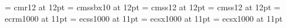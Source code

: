\def\setcodefonts#1#2{
  \font\CMfont = cmr12 at #1  %
  \font\KWfont = cmssbx10 at #1   %
  \font\VRfont = cmss12 at #1   %
  \font\BGfont = cmss12 at #1   %
  \font\rawcm  = ecrm1000 at #2  %
  \font\rawrm  = ecss1000 at #2  %
  \font\rawbf  = ecsx1000 at #2
  \font\rawhv  = ecsx1000 at #2
}
\setcodefonts{12pt}{11pt}

\def\labelitemi{\textbullet}
\def\la{{\rawrm\char'074}}
\def\ra{{\rawrm\char'076}}
\def\codeleq{{\ensuremath\leq}}
\def\codeminus{{\ensuremath-}}
\def\codelb{{\rawrm\char'173}}
\def\coderb{{\rawrm\char'175}}
\def\textlt{{\rawcm\char'074}}
\def\textgt{{\rawcm\char'076}}
\def\cd#1{{\BGfont#1}}
\def\id#1{\texttt{#1}}
\def\to{\ensuremath\rightarrow}


\def\Mop#1{{#1}}
\def\Mbegincode{\Mop{\rawhv.\la}\thinspace}
\def\Mendcode{\thinspace\Mop{\ra\rawhv.}}
\def\Msplice{\Mop{\rawhv.\char'176}}
\def\Mtilde{\char'176}
\def\Mbang{{\rawhv!}}
\def\Mrun{\Mop{\rawhv.!}}

\def\Msp#1{{#1}}
\def\Mquote#1{\Msp{\rawhv\char'074{\rawbf?}#1}\thinspace}
\def\Munquote{\thinspace\Msp{{\rawbf?}{\rawhv\char'076}}}

